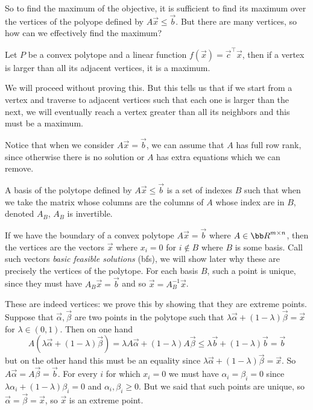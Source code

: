 So to find the maximum of the objective, it is sufficient to find its maximum over the vertices of the polyope defined by $A\vec x\leq\vec b$.
But there are many vertices, so how can we effectively find the maximum?

\blemm

    Let $P$ be a convex polytope and a linear function $f(\vec x)=\vec c^\top\vec x$, then if a vertex is larger than all its adjacent vertices, it is a maximum.

\elemm

We will proceed without proving this.
But this tells us that if we start from a vertex and traverse to adjacent vertices such that each one is larger than the next, we will eventually reach a vertex greater than all its neighbors and this must
be a maximum.

Notice that when we consider $A\vec x=\vec b$, we can assume that $A$ has full row rank, since otherwise there is no solution or $A$ has extra equations which we can remove.

\bdefn

    A {\emphcolor basis} of the polytope defined by $A\vec x\leq\vec b$ is a set of indexes $B$ such that when we take the matrix whose columns are the columns of $A$ whose index are in $B$, denoted $A_B$,
    $A_B$ is invertible.

\edefn

If we have the boundary of a convex polytope $A\vec x=\vec b$ where $A\in{\bb R}^{m\times n}$, then the vertices are the vectors $\vec x$ where $x_i=0$ for $i\notin B$ where $B$ is some basis.
Call such vectors {\it basic feasible solutions} (bfs), we will show later why these are precisely the vertices of the polytope.
For each basis $B$, such a point is unique, since they must have $A_B\vec x=\vec b$ and so $\vec x=A_B^{-1}\vec x$.

These are indeed vertices: we prove this by showing that they are extreme points.
Suppose that $\vec\alpha,\vec\beta$ are two points in the polytope such that $\lambda\vec\alpha+(1-\lambda)\vec\beta=\vec x$ for $\lambda\in(0,1)$.
Then on one hand
$$ A(\lambda\vec\alpha+(1-\lambda)\vec\beta) = \lambda A\vec\alpha + (1-\lambda)A\vec\beta \leq\lambda\vec b+(1-\lambda)\vec b=\vec b $$
but on the other hand this must be an equality since $\lambda\vec\alpha+(1-\lambda)\vec\beta=\vec x$.
So $A\vec\alpha=A\vec\beta=\vec b$.
For every $i$ for which $x_i=0$ we must have $\alpha_i=\beta_i=0$ since $\lambda\alpha_i+(1-\lambda)\beta_i=0$ and $\alpha_i,\beta_i\geq0$.
But we said that such points are unique, so $\vec\alpha=\vec\beta=\vec x$, so $\vec x$ is an extreme point.

